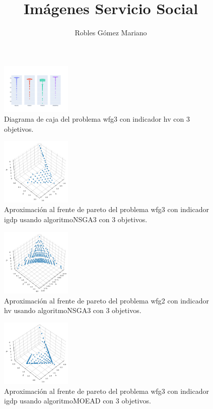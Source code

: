 \documentclass{article}
\title{Imágenes Servicio Social}
\author{Robles Gómez Mariano}
\begin{document}
	\maketitle


\begin{figure}
	\includegraphics[width=0.3\textwidth]{wfg3_hv_3_bp.png}
	\caption[width=0.3]{Diagrama de caja del problema wfg3 con indicador hv con 3 objetivos.}
\end{figure}
\begin{figure}
	\includegraphics[width=0.3\textwidth]{NSGA3_wfg3_igdp_3_fp.png}
	\caption{Aproximación al frente de pareto del problema wfg3 con indicador igdp usando algoritmoNSGA3 con 3 objetivos.}
\end{figure}
\begin{figure}
	\includegraphics[width=0.3\textwidth]{NSGA3_wfg2_hv_3_fp.png}
	\caption{Aproximación al frente de pareto del problema wfg2 con indicador hv usando algoritmoNSGA3 con 3 objetivos.}
\end{figure}
\clearpage
\begin{figure}
	\includegraphics[width=0.3\textwidth]{MOEAD_wfg3_igdp_3_fp.png}
	\caption{Aproximación al frente de pareto del problema wfg3 con indicador igdp usando algoritmoMOEAD con 3 objetivos.}
\end{figure}
\end{document}
